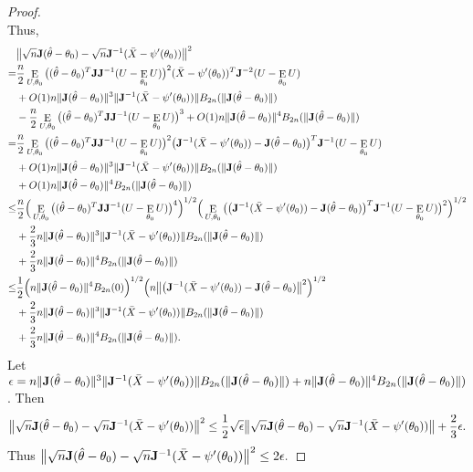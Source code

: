 \documentclass[11pt, letterpaper]{article}
\DeclareMathOperator{\myE}{E}
\theoremstyle{plain}
\theoremstyle{definition}
\theoremstyle{remark}
\begin{document}
\begin{proof}
$$    $$
    Thus,
    $$
    \begin{aligned}
        &\big\|\sqrt{n}\BJ(\hat{\theta}-\theta_0)-\sqrt{n}\BJ^{-1}(\bar{X}-\psi'(\theta_0))\big\|^2 \\
        =&
        \frac{n}{2}\myE_{U,\theta_0}\big((\hat{\theta}-\theta_0)^T \BJ \BJ^{-1}(U-\myE_{\theta_0}U)\big)^2 (\bar{X}-\psi'(\theta_0))^T \BJ^{-2}(U-\myE_{\theta_0}U)\\
        &+O(1) n \|\BJ (\hat{\theta}-\theta_0)\|^3\|\BJ^{-1}(\bar{X}-\psi'(\theta_0))\| B_{2n}(\|\BJ(\hat{\theta}-\theta_0)\|)\\
        &-\frac{n}{2}\myE_{U,\theta_0}\big((\hat{\theta}-\theta_0)^T \BJ \BJ^{-1}(U-\myE_{\theta_0}U)\big)^3
        +O(1)n\|\BJ(\hat{\theta}-\theta_0)\|^4 B_{2n}(\|\BJ (\hat{\theta}-\theta_0)\|)\\
        =&
        \frac{n}{2}\myE_{U,\theta_0}\big((\hat{\theta}-\theta_0)^T \BJ \BJ^{-1}(U-\myE_{\theta_0}U)\big)^2 \big(\BJ^{-1}(\bar{X}-\psi'(\theta_0)) -\BJ (\hat{\theta}-\theta_0) \big)^T \BJ^{-1}(U-\myE_{\theta_0}U)\\ 
        &+O(1) n \|\BJ (\hat{\theta}-\theta_0)\|^3\|\BJ^{-1}(\bar{X}-\psi'(\theta_0))\| B_{2n}(\|\BJ(\hat{\theta}-\theta_0)\|)\\
        &+O(1)n\|\BJ(\hat{\theta}-\theta_0)\|^4 B_{2n}(\|\BJ (\hat{\theta}-\theta_0)\|)\\
        \leq&
        \frac{n}{2}\Big(\myE_{U,\theta_0}\big((\hat{\theta}-\theta_0)^T \BJ \BJ^{-1}(U-\myE_{\theta_0}U)\big)^4\Big)^{1/2} \Big(\myE_{U,\theta_0}\big(\big(\BJ^{-1}(\bar{X}-\psi'(\theta_0)) -\BJ (\hat{\theta}-\theta_0) \big)^T \BJ^{-1}(U-\myE_{\theta_0}U)\big)^2\Big)^{1/2}\\ 
        &+\frac{2}{3} n \|\BJ (\hat{\theta}-\theta_0)\|^3\|\BJ^{-1}(\bar{X}-\psi'(\theta_0))\| B_{2n}(\|\BJ(\hat{\theta}-\theta_0)\|)\\
        &+\frac{2}{3} n\|\BJ(\hat{\theta}-\theta_0)\|^4 B_{2n}(\|\BJ (\hat{\theta}-\theta_0)\|)\\
        \leq&
        \frac{1}{2}\Big(n\|\BJ(\hat{\theta}-\theta_0)\|^4 B_{2n}(0)\Big)^{1/2} \Big(n\big\|\big(\BJ^{-1}(\bar{X}-\psi'(\theta_0)) -\BJ (\hat{\theta}-\theta_0) \big\|^2 \Big)^{1/2}\\ 
        &+\frac{2}{3} n \|\BJ (\hat{\theta}-\theta_0)\|^3\|\BJ^{-1}(\bar{X}-\psi'(\theta_0))\| B_{2n}(\|\BJ(\hat{\theta}-\theta_0)\|)\\
        &+\frac{2}{3} n\|\BJ(\hat{\theta}-\theta_0)\|^4 B_{2n}(\|\BJ (\hat{\theta}-\theta_0)\|).
    \end{aligned}
    $$
    Let
    $
        \epsilon= n \|\mathbf{J} (\hat{\theta}-\theta_0)\|^3\|\mathbf{J}^{-1}(\bar{X}-\psi'(\theta_0))\| B_{2n}(\|\mathbf{J}(\hat{\theta}-\theta_0)\|)
        + n\|\mathbf{J}(\hat{\theta}-\theta_0)\|^4 B_{2n}(\|\mathbf{J} (\hat{\theta}-\theta_0)\|)
    $.
    Then 
    $$\big\|\sqrt{n}\mathbf{J}(\hat{\theta}-\theta_0)-\sqrt{n}\mathbf{J}^{-1}(\bar{X}-\psi'(\theta_0))\big\|^2 \leq \frac{1}{2}\sqrt{\epsilon} \big\|\sqrt{n}\mathbf{J}(\hat{\theta}-\theta_0)-\sqrt{n}\mathbf{J}^{-1}(\bar{X}-\psi'(\theta_0))\big\|+\frac{2}{3}\epsilon.$$
    Thus
    $
    \big\|\sqrt{n}\mathbf{J}(\hat{\theta}-\theta_0)-\sqrt{n}\mathbf{J}^{-1}(\bar{X}-\psi'(\theta_0))\big\|^2\leq 2\epsilon.
    $
\end{proof}
\end{document}
